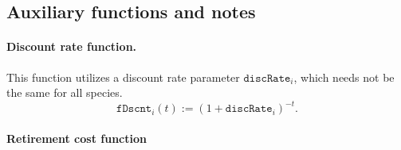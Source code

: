 \documentclass{amsart}
\begin{document}
\begin{appendices}
\section{Auxiliary functions and notes}\label{appendix}
    \paragraph{Discount rate function.}
This function utilizes a discount rate parameter $\mathtt{discRate}_i$, which
needs not be the same for all species.
\begin{equation}
    \mathtt{fDscnt}_i
    \left(t\right)
    := {\left(1+\mathtt{discRate}_i\right)}^{-t}.
\end{equation}
%
    \paragraph{Retirement cost function}


\end{appendices}
\end{document}

